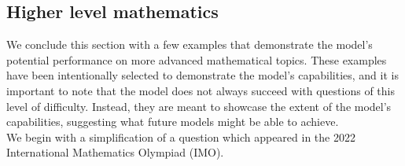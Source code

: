 \subsection{Higher level mathematics}

We conclude this section with a few examples that demonstrate the model's potential performance on more advanced mathematical topics. These examples have been intentionally selected to demonstrate the model's capabilities, and it is important to note that the model does not always succeed with questions of this level of difficulty. Instead, they are meant to showcase the extent of the model's capabilities, suggesting what future models might be able to achieve. \\

We begin with a simplification of a question which appeared in the 2022 International Mathematics Olympiad (IMO).

